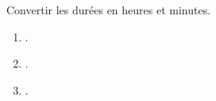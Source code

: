 \begin{exercice*}
   Convertir les durées en heures et minutes.
   \begin{multicols}{3}
      \begin{enumerate}
         \item {}.
         \item {}.
         \item {}.
      \end{enumerate}
   \end{multicols}
\end{exercice*}